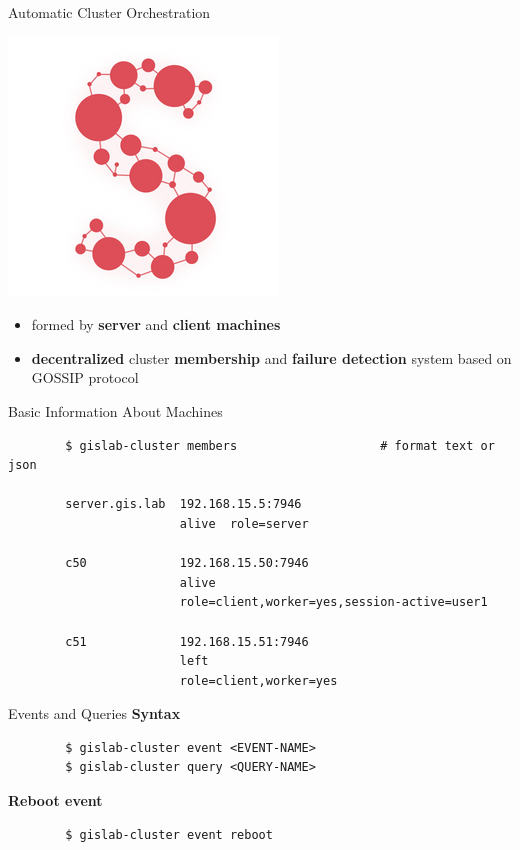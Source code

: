 \documentclass[12pt]{beamer}
\begin{document}
\begin{frame}{Automatic Cluster Orchestration}
	\begin{center}
		\includegraphics[keepaspectratio=true,height=0.5\textheight]{images/serf.png}
	\end{center}
	\begin{itemize}
		\item formed by \textbf{server} and \textbf{client machines}
		\item \textbf{decentralized} cluster \textbf{membership} and \textbf{failure detection} system based on GOSSIP protocol
	\end{itemize}
\end{frame}

\begin{frame}[fragile]{Basic Information About Machines}
	\lstset{language=sh}
	\begin{lstlisting}
		$ gislab-cluster members					# format text or json 

		server.gis.lab  192.168.15.5:7946 
		                alive  role=server

		c50             192.168.15.50:7946
		                alive
		                role=client,worker=yes,session-active=user1

		c51             192.168.15.51:7946
		                left
		                role=client,worker=yes
	\end{lstlisting}
\end{frame}

\begin{frame}[fragile]{Events and Queries}
	\textbf{Syntax}
	\lstset{language=sh}
	\begin{lstlisting}
		$ gislab-cluster event <EVENT-NAME>
		$ gislab-cluster query <QUERY-NAME>		
	\end{lstlisting}

	\textbf{Reboot event}
	\lstset{language=sh}
	\begin{lstlisting}
		$ gislab-cluster event reboot
	\end{lstlisting}
\end{frame}
\end{document}
